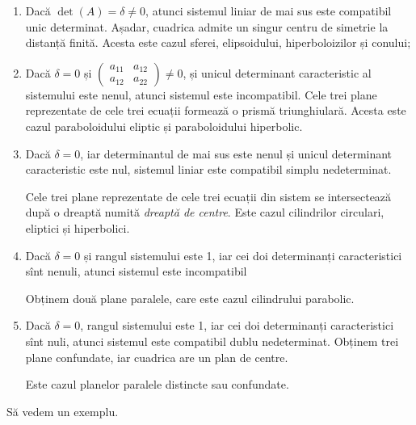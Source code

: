 \documentclass[11pt,a4paper]{article}
\theoremstyle{dotless}
\theoremstyle{dotlessdr}
\begin{document}
\begin{enumerate}[(1)]
	\item Dacă $\det(A) = \delta \neq 0$, atunci sistemul liniar de mai sus
este compatibil unic determinat. Așadar, cuadrica admite un singur centru
de simetrie la distanță finită. Acesta este cazul sferei, elipsoidului,
hiperboloizilor și conului;
    \item Dacă $\delta = 0$ și $\begin{pmatrix}
	                                a_{11} & a_{12} \\
	                                a_{12} & a_{22}
                                \end{pmatrix} \neq 0$,
și unicul determinant caracteristic al sistemului este nenul, atunci sistemul
este incompatibil. Cele trei plane reprezentate de cele trei ecuații formează
o prismă triunghiulară. Acesta este cazul paraboloidului eliptic și
paraboloidului hiperbolic.

    \item Dacă $\delta = 0$, iar determinantul de mai sus este nenul și
unicul determinant caracteristic este nul, sistemul liniar este compatibil
simplu nedeterminat.

Cele trei plane reprezentate de cele trei ecuații din sistem se intersectează
după o dreaptă numită \emph{dreaptă de centre}. Este cazul cilindrilor 
circulari, eliptici și hiperbolici.

    \item Dacă $\delta = 0$ și rangul sistemului este 1, iar cei doi 
determinanți caracteristici sînt nenuli, atunci sistemul este incompatibil

Obținem două plane paralele, care este cazul cilindrului parabolic.

    \item Dacă $\delta = 0$, rangul sistemului este 1, iar cei doi
determinanți caracteristici sînt nuli, atunci sistemul este compatibil dublu
nedeterminat. Obținem trei plane confundate, iar cuadrica are un plan de centre.

Este cazul planelor paralele distincte sau confundate.
\end{enumerate}

Să vedem un exemplu.
\end{document}
